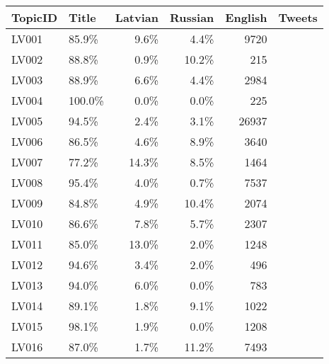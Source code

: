 \begin{tabular}{llrrrr}
\toprule
TopicID  & Title &  Latvian & Russian & English &  Tweets \\
\midrule
LV001    &  85.9\% &  9.6\% &  4.4\% &   9720 \\
LV002    &  88.8\% &  0.9\% & 10.2\% &    215 \\
LV003    &  88.9\% &  6.6\% &  4.4\% &   2984 \\
LV004    & 100.0\% &  0.0\% &  0.0\% &    225 \\
LV005    &  94.5\% &  2.4\% &  3.1\% &  26937 \\
LV006    &  86.5\% &  4.6\% &  8.9\% &   3640 \\
LV007    &  77.2\% & 14.3\% &  8.5\% &   1464 \\
LV008    &  95.4\% &  4.0\% &  0.7\% &   7537 \\
LV009    &  84.8\% &  4.9\% & 10.4\% &   2074 \\
LV010    &  86.6\% &  7.8\% &  5.7\% &   2307 \\
LV011    &  85.0\% & 13.0\% &  2.0\% &   1248 \\
LV012    &  94.6\% &  3.4\% &  2.0\% &    496 \\
LV013    &  94.0\% &  6.0\% &  0.0\% &    783 \\
LV014    &  89.1\% &  1.8\% &  9.1\% &   1022 \\
LV015    &  98.1\% &  1.9\% &  0.0\% &   1208 \\
LV016    &  87.0\% &  1.7\% & 11.2\% &   7493 \\
\bottomrule
\end{tabular}
